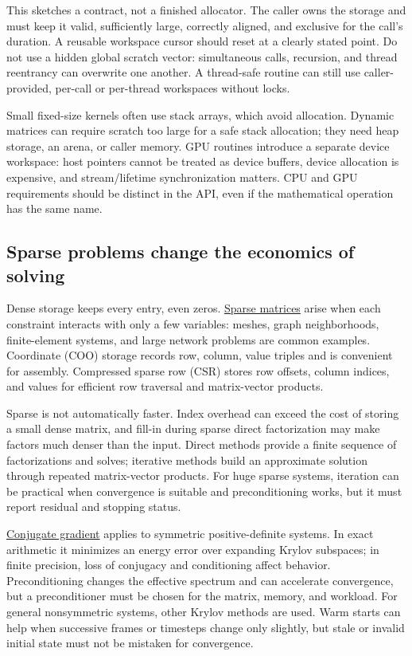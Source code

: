 This sketches a contract, not a finished allocator. The caller owns the storage and must keep it valid, sufficiently large, correctly aligned, and exclusive for the call's duration. A reusable workspace cursor should reset at a clearly stated point. Do not use a hidden global scratch vector: simultaneous calls, recursion, and thread reentrancy can overwrite one another. A thread-safe routine can still use caller-provided, per-call or per-thread workspaces without locks.

Small fixed-size kernels often use stack arrays, which avoid allocation. Dynamic matrices can require scratch too large for a safe stack allocation; they need heap storage, an arena, or caller memory. GPU routines introduce a separate device workspace: host pointers cannot be treated as device buffers, device allocation is expensive, and stream/lifetime synchronization matters. CPU and GPU requirements should be distinct in the API, even if the mathematical operation has the same name.

\subsection{Sparse problems change the economics of solving}\label{sparse-problems-change-the-economics-of-solving}

Dense storage keeps every entry, even zeros. \hyperref[02-foundations-ii-ch038]{Sparse matrices} arise when each constraint interacts with only a few variables: meshes, graph neighborhoods, finite-element systems, and large network problems are common examples. Coordinate (COO) storage records row, column, value triples and is convenient for assembly. Compressed sparse row (CSR) stores row offsets, column indices, and values for efficient row traversal and matrix-vector products.

Sparse is not automatically faster. Index overhead can exceed the cost of storing a small dense matrix, and fill-in during sparse direct factorization may make factors much denser than the input. Direct methods provide a finite sequence of factorizations and solves; iterative methods build an approximate solution through repeated matrix-vector products. For huge sparse systems, iteration can be practical when convergence is suitable and preconditioning works, but it must report residual and stopping status.

\hyperref[02-foundations-ii-ch038]{Conjugate gradient} applies to symmetric positive-definite systems. In exact arithmetic it minimizes an energy error over expanding Krylov subspaces; in finite precision, loss of conjugacy and conditioning affect behavior. Preconditioning changes the effective spectrum and can accelerate convergence, but a preconditioner must be chosen for the matrix, memory, and workload. For general nonsymmetric systems, other Krylov methods are used. Warm starts can help when successive frames or timesteps change only slightly, but stale or invalid initial state must not be mistaken for convergence.

